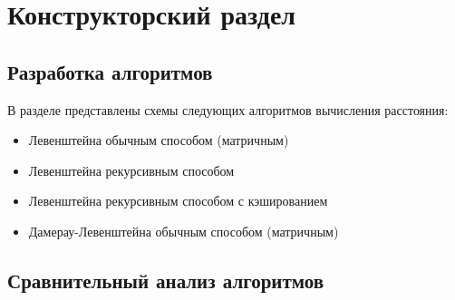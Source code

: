 \chapter{Конструкторский раздел}
\section{Разработка алгоритмов}
В разделе представлены схемы следующих алгоритмов вычисления расстояния:
\begin{itemize}
	\item Левенштейна обычным способом (матричным)
	\item Левенштейна рекурсивным способом
	\item Левенштейна рекурсивным способом с кэшированием
	\item Дамерау-Левенштейна обычным способом (матричным)
\end{itemize}


\section{Сравнительный анализ алгоритмов}
